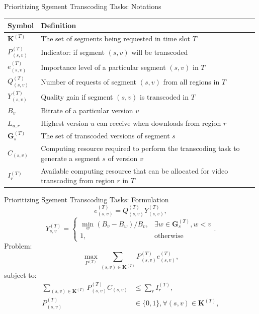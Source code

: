 \documentclass{beamer}
\newcommand{\setS}{\mathbf{G}}
\newcommand{\comp}{C}
\newcommand{\TranscodeIndicator}{P}
\newcommand{\RequestingSeg}{\mathbf{K}}
\newcommand{\IdleComp}{I}
\newcommand{\Version}{L}
\newcommand{\ReqOfSeg}{Q}
\newcommand{\SegQuality}{Y}
\newcommand{\Bitrate}{B}
\begin{document}
\begin{frame}{Prioritizing Sgement Transcoding Tasks: Notations}
	\centering
	\begin{tabular}{|p{0.10\linewidth}||p{0.89\linewidth}|}
		\hline 
		Symbol & Definition \\ 
		\hline
		\emph{$\RequestingSeg^{(T)}$} 		& The set of segments being requested in time slot $T$ \\ 
		\emph{$\TranscodeIndicator^{(T)}_{(s,v)}$} 		& Indicator: if segment $(s,v)$ will be transcoded \\ 
		\emph{$e_{(s,v)}^{(T)}$} 		& Importance level of a particular segment $(s,v)$ in $T$  \\
		\emph{$\ReqOfSeg^{(T)}_{(s,v)}$} 		& Number of requests of segment $(s,v)$  from all regions in $T$ \\
		\emph{$\SegQuality_{(s,v)}^{(T)}$} 		& Quality gain if segment $(s,v)$ is transcoded in $T$\\
		\emph{$\Bitrate_v$} 		&  Bitrate of a particular version $v$ \\
		\emph{$\Version_{u,r}$} 		&  Highest version $u$ can receive when downloads from region $r$ \\
		\emph{$\setS^{(T)}_{s}$} 		& The set of transcoded versions of segment $s$  \\
		\emph{$\comp_{(s,v)}$} 		& Computing resource required to perform the transcoding task to generate a segment $s$ of version $v$ \\
		\emph{$\IdleComp^{(T)}_r$} 		& Available computing resource that can be allocated for video transcoding from region $r$ in $T$ \\
		\hline 
	\end{tabular} 
\end{frame}

\begin{frame}{Prioritizing Sgement Transcoding Tasks: Formulation}
	$$e_{(s,v)}^{(T)} = \ReqOfSeg^{(T)}_{(s,v)} \SegQuality_{(s,v)}^{(T)},$$
	$$
	\SegQuality_{s,v}^{(T)} = \begin{cases}
	\min_w(\Bitrate_{v} - \Bitrate_{w})/{\Bitrate_{v}}, & \exists w \in \setS^{(T)}_s, w < v \\
	1, & \text{otherwise}
	\end{cases}.
	$$
	Problem:
	\begin{equation}
	\max_{\TranscodeIndicator^{(T)}} \sum_{(s,v) \in \RequestingSeg^{(T)}} \TranscodeIndicator^{(T)}_{(s,v)} e_{(s,v)}^{(T)}, 
	\end{equation}
	subject to:
	\[
	\begin{split}
	\sum_{(s,v) \in \RequestingSeg^{(T)}} \TranscodeIndicator^{(T)}_{(s,v)} \comp_{(s,v)} & \le \sum_r \IdleComp^{(T)}_r, \\
	\TranscodeIndicator^{(T)}_{(s,v)} & \in \{0,1\}, \forall (s,v) \in \RequestingSeg^{(T)}, \\
	\end{split}
	\]
\end{frame}
\end{document}
